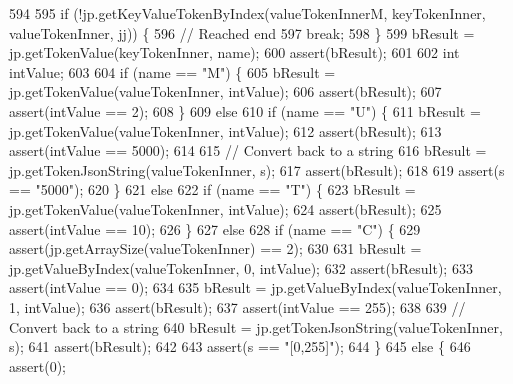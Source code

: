 \begin{DoxyCode}
{{{{{{594 
595                 \textcolor{keywordflow}{if} (!jp.getKeyValueTokenByIndex(valueTokenInnerM, keyTokenInner, valueTokenInner, jj)) \{
596                     \textcolor{comment}{// Reached end}
597                     \textcolor{keywordflow}{break};
598                 \}
599                 bResult = jp.getTokenValue(keyTokenInner, name);
600                 assert(bResult);
601 
602                 \textcolor{keywordtype}{int} intValue;
603 
604                 \textcolor{keywordflow}{if} (name == \textcolor{stringliteral}{"M"}) \{
605                     bResult = jp.getTokenValue(valueTokenInner, intValue);
606                     assert(bResult);
607                     assert(intValue == 2);
608                 \}
609                 \textcolor{keywordflow}{else}
610                 \textcolor{keywordflow}{if} (name == \textcolor{stringliteral}{"U"}) \{
611                     bResult = jp.getTokenValue(valueTokenInner, intValue);
612                     assert(bResult);
613                     assert(intValue == 5000);
614 
615                     \textcolor{comment}{// Convert back to a string}
616                     bResult = jp.getTokenJsonString(valueTokenInner, s);
617                     assert(bResult);
618 
619                     assert(s == \textcolor{stringliteral}{"5000"});
620                 \}
621                 \textcolor{keywordflow}{else}
622                 \textcolor{keywordflow}{if} (name == \textcolor{stringliteral}{"T"}) \{
623                     bResult = jp.getTokenValue(valueTokenInner, intValue);
624                     assert(bResult);
625                     assert(intValue == 10);
626                 \}
627                 \textcolor{keywordflow}{else}
628                 \textcolor{keywordflow}{if} (name == \textcolor{stringliteral}{"C"}) \{
629                     assert(jp.getArraySize(valueTokenInner) == 2);
630 
631                     bResult = jp.getValueByIndex(valueTokenInner, 0, intValue);
632                     assert(bResult);
633                     assert(intValue == 0);
634 
635                     bResult = jp.getValueByIndex(valueTokenInner, 1, intValue);
636                     assert(bResult);
637                     assert(intValue == 255);
638 
639                     \textcolor{comment}{// Convert back to a string}
640                     bResult = jp.getTokenJsonString(valueTokenInner, s);
641                     assert(bResult);
642 
643                     assert(s == \textcolor{stringliteral}{"[0,255]"});
644                 \}
645                 \textcolor{keywordflow}{else} \{
646                     assert(0);
}}}}}}
\end{DoxyCode}
